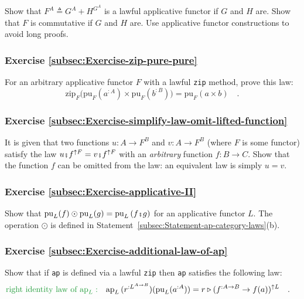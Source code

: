 Show that $F^{A}\triangleq G^{A}+H^{G^{A}}$ is a lawful applicative
functor if $G$ and $H$ are. Show that $F$ is commutative if $G$
and $H$ are. Use applicative functor constructions to avoid long
proofs.

\subsubsection{Exercise \label{subsec:Exercise-zip-pure-pure}\ref{subsec:Exercise-zip-pure-pure}}

For an arbitrary applicative functor $F$ with a lawful \lstinline!zip!
method, prove this law:
\[
\text{zip}_{F}\big(\text{pu}_{F}(a^{:A})\times\text{pu}_{F}(b^{:B})\big)=\text{pu}_{F}(a\times b)\quad.
\]


\subsubsection{Exercise \label{subsec:Exercise-simplify-law-omit-lifted-function}\ref{subsec:Exercise-simplify-law-omit-lifted-function}}

It is given that two functions $u:A\rightarrow F^{B}$ and $v:A\rightarrow F^{B}$
(where $F$ is some functor) satisfy the law $u\bef f^{\uparrow F}=v\bef f^{\uparrow F}$
with an \emph{arbitrary} function $f:B\rightarrow C$. Show that the
function $f$ can be omitted from the law: an equivalent law is simply
$u=v$.

\subsubsection{Exercise \label{subsec:Exercise-applicative-II}\ref{subsec:Exercise-applicative-II}}

Show that $\text{pu}_{L}(f)\odot\text{pu}_{L}(g)=\text{pu}_{L}\left(f\bef g\right)$
for an applicative functor $L$. The operation $\odot$ is defined
in Statement~\ref{subsec:Statement-ap-category-laws}(b).

\subsubsection{Exercise \label{subsec:Exercise-additional-law-of-ap}\ref{subsec:Exercise-additional-law-of-ap}}

Show that if \lstinline!ap! is defined via a lawful \lstinline!zip!
then \lstinline!ap! satisfies the following law:
\begin{align*}
{\color{greenunder}\text{right identity law of }\text{ap}_{L}:}\quad & \text{ap}_{L}\,(r^{:L^{A\rightarrow B}})(\text{pu}_{L}(a^{:A}))=r\triangleright(f^{:A\rightarrow B}\rightarrow f(a))^{\uparrow L}\quad.
\end{align*}


